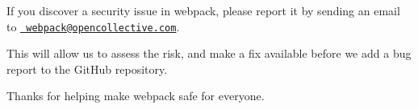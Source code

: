 If you discover a security issue in webpack, please report it by sending an email to \href{mailto:webpack@opencollective.com}{\texttt{ webpack@opencollective.\+com}}.

This will allow us to assess the risk, and make a fix available before we add a bug report to the Git\+Hub repository.

Thanks for helping make webpack safe for everyone. 